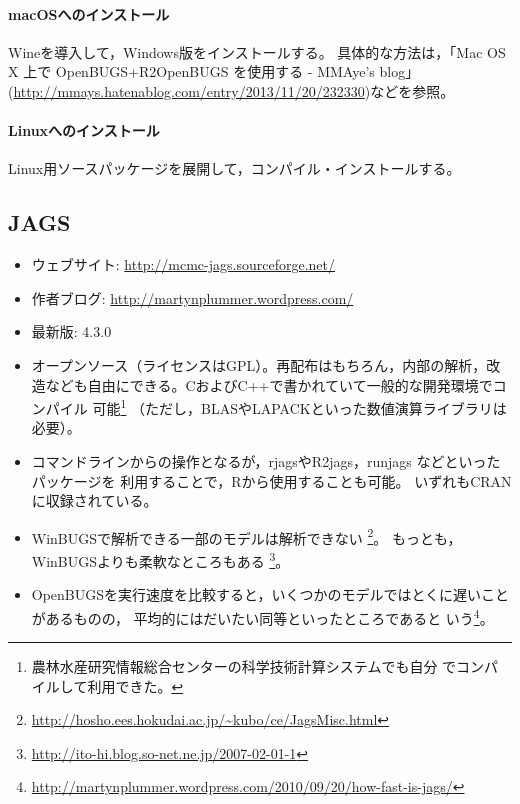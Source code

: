 \documentclass[11pt,uplatex]{jsarticle}
\begin{document}
\paragraph{macOSへのインストール}
\textsf{Wine}を導入して，Windows版をインストールする。
具体的な方法は，「Mac OS X 上で OpenBUGS+R2OpenBUGS を使用する - MMAye's blog」(\url{http://mmays.hatenablog.com/entry/2013/11/20/232330})などを参照。

\paragraph{Linuxへのインストール}
Linux用ソースパッケージを展開して，コンパイル・インストールする。

\subsection{JAGS}

\begin{itemize}

\item ウェブサイト:
  \url{http://mcmc-jags.sourceforge.net/}
  
\item 作者ブログ:
  \url{http://martynplummer.wordpress.com/}  

\item 最新版: 4.3.0

\item オープンソース（ライセンスはGPL）。再配布はもちろん，内部の解析，改
  造なども自由にできる。CおよびC++で書かれていて一般的な開発環境でコンパイル
  可能\footnote{農林水産研究情報総合センターの科学技術計算システムでも自分
  でコンパイルして利用できた。}
  （ただし，BLASやLAPACKといった数値演算ライブラリは必要）。

\item コマンドラインからの操作となるが，\textsf{rjags}や\textsf{R2jags}，\textsf{runjags}
などといったパッケージを
利用することで，\textsf{R}から使用することも可能。
いずれもCRANに収録されている。

\item \textsf{WinBUGS}で解析できる一部のモデルは解析できない
  \footnote{\url{http://hosho.ees.hokudai.ac.jp/~kubo/ce/JagsMisc.html}}。
 もっとも，\textsf{WinBUGS}よりも柔軟なところもある
  \footnote{\url{http://ito-hi.blog.so-net.ne.jp/2007-02-01-1}}。
  
\item \textsf{OpenBUGS}を実行速度を比較すると，いくつかのモデルではとくに遅いことがあるものの，
平均的にはだいたい同等といったところであると
いう\footnote{\url{http://martynplummer.wordpress.com/2010/09/20/how-fast-is-jags/}}。

\end{itemize}
\end{document}
